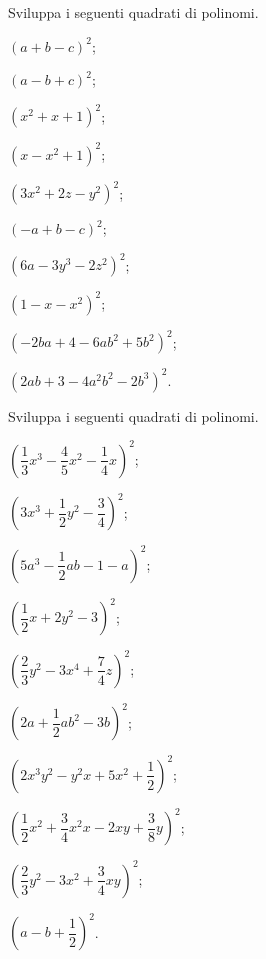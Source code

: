 \pagebreak
\begin{esercizio}
 \label{ese:11.12}
Sviluppa i seguenti quadrati di polinomi.
\begin{multicols}{2}
\begin{enumeratea}
\item $\left(a+b-c\right)^{2}$;
\item $\left(a-b+c\right)^{2}$;
\item $\left(x^{2}+x+1\right)^{2}$;
\item $\left(x-x^{2}+1\right)^{2}$;
\item $\left(3x^{2}+2z-y^{2}\right)^{2}$;
\item $\left(-a+b-c\right)^{2}$;
\item $\left(6a-3y^{3}-2z^{2}\right)^{2}$;
\item $\left(1-x-x^{2}\right)^{2}$;
\item $\left(-2{ba}+4-6{ab}^{2}+5b^{2}\right)^{2}$;
\item $\left(2{ab}+3-4a^{2}b^{2}-2b^{3}\right)^{2}$.
\end{enumeratea}
\end{multicols}
\end{esercizio}

\begin{esercizio}
 \label{ese:11.13}
Sviluppa i seguenti quadrati di polinomi.
\begin{multicols}{2}
\begin{enumeratea}
\spazielenx
\item $\left(\dfrac{1}{3}x^{3}-\dfrac{4}{5}x^{2}-\dfrac{1}{4}x\right)^{2}$;
\item $\left(3x^{3}+\dfrac{1}{2}y^{2}-\dfrac{3}{4}\right)^{2}$;
\item $\left(5a^{3}-\dfrac{1}{2}{ab}-1-a\right)^{2}$;
\item $\left(\dfrac{1}{2}x+2y^{2}-3\right)^{2}$;
\item $\left(\dfrac{2}{3}y^{2}-3x^{4}+\dfrac{7}{4}z\right)^{2}$;
\item $\left(2a+\dfrac{1}{2}{ab}^{2}-3b\right)^{2}$;
\item $\left(2x^{3}y^{2}-y^{2}x+5x^{2}+\dfrac{1}{2}\right)^{2}$;
\item $\left(\dfrac{1}{2}x^{2}+\dfrac{3}{4}x^{2}x-2{xy}+\dfrac{3}{8}y\right)^{2}$;
\item $\left(\dfrac{2}{3}y^{2}-3x^{2}+\dfrac{3}{4}{xy}\right)^{2}$;
\item $\left(a-b+\dfrac{1}{2}\right)^{2}$.
\end{enumeratea}
\end{multicols}
\end{esercizio}

